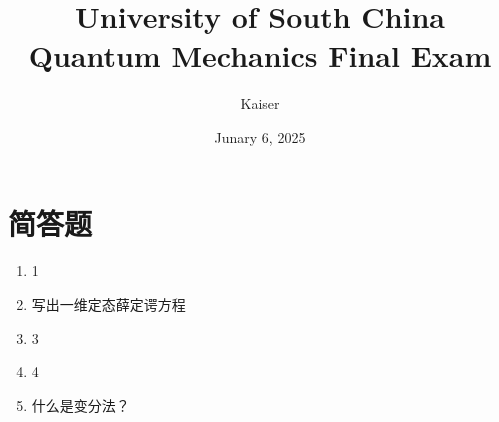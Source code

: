 \documentclass{article}
\title{University of South China Quantum Mechanics
Final Exam}
\author{Kaiser}
\date{Junary 6, 2025}
\begin{document}
\maketitle

\section{简答题}
\begin{enumerate}
    \item 1 
    \item  写出一维定态薛定谔方程
    \item  3
    \item  4
    \item  什么是变分法？
\end{enumerate}
\end{document}
